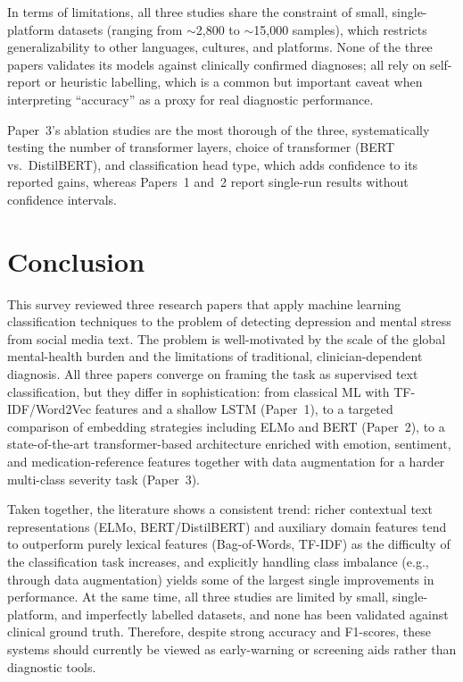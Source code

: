 \documentclass[a4paper,12pt]{article}
\begin{document}
In terms of limitations, all three studies share the constraint of small, single-platform datasets (ranging from $\sim$2,800 to $\sim$15,000 samples), which restricts generalizability to other languages, cultures, and platforms. None of the three papers validates its models against clinically confirmed diagnoses; all rely on self-report or heuristic labelling, which is a common but important caveat when interpreting ``accuracy'' as a proxy for real diagnostic performance.

Paper~3's ablation studies are the most thorough of the three, systematically testing the number of transformer layers, choice of transformer (BERT vs.\ DistilBERT), and classification head type, which adds confidence to its reported gains, whereas Papers~1 and~2 report single-run results without confidence intervals.

\section{Conclusion}

This survey reviewed three research papers that apply machine learning classification techniques to the problem of detecting depression and mental stress from social media text. The problem is well-motivated by the scale of the global mental-health burden and the limitations of traditional, clinician-dependent diagnosis. All three papers converge on framing the task as supervised text classification, but they differ in sophistication: from classical ML with TF-IDF/Word2Vec features and a shallow LSTM (Paper~1), to a targeted comparison of embedding strategies including ELMo and BERT (Paper~2), to a state-of-the-art transformer-based architecture enriched with emotion, sentiment, and medication-reference features together with data augmentation for a harder multi-class severity task (Paper~3).

Taken together, the literature shows a consistent trend: richer contextual text representations (ELMo, BERT/DistilBERT) and auxiliary domain features tend to outperform purely lexical features (Bag-of-Words, TF-IDF) as the difficulty of the classification task increases, and explicitly handling class imbalance (e.g., through data augmentation) yields some of the largest single improvements in performance. At the same time, all three studies are limited by small, single-platform, and imperfectly labelled datasets, and none has been validated against clinical ground truth. Therefore, despite strong accuracy and F1-scores, these systems should currently be viewed as early-warning or screening aids rather than diagnostic tools.
\end{document}
